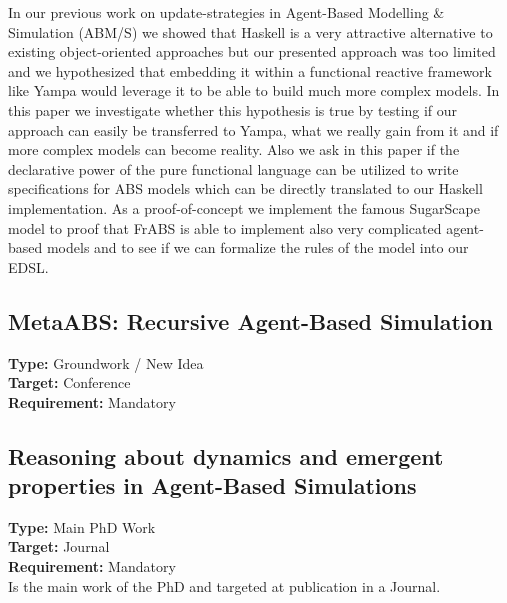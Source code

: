 In our previous work on update-strategies in Agent-Based Modelling \& Simulation (ABM/S) we showed that Haskell is a very attractive alternative to existing object-oriented approaches but our presented approach was too limited and we hypothesized that embedding it within a functional reactive framework like Yampa would leverage it to be able to build much more complex models. In this paper we investigate whether this hypothesis is true by testing if our approach can easily be transferred to Yampa, what we really gain from it and if more complex models can become reality. Also we ask in this paper if the declarative power of the pure functional language can be utilized to write specifications for ABS models which can be directly translated to our Haskell implementation. As a proof-of-concept we implement the famous SugarScape model to proof that FrABS is able to implement also very complicated agent-based models and to see if we can formalize the rules of the model into our EDSL. 

\subsection{MetaABS: Recursive Agent-Based Simulation}
\textbf{Type:} Groundwork / New Idea \\
\textbf{Target:} Conference \\
\textbf{Requirement:} Mandatory \\

\subsection{Reasoning about dynamics and emergent properties in Agent-Based Simulations}
\textbf{Type:} Main PhD Work \\
\textbf{Target:} Journal \\
\textbf{Requirement:} Mandatory \\

Is the main work of the PhD and targeted at publication in a Journal.

